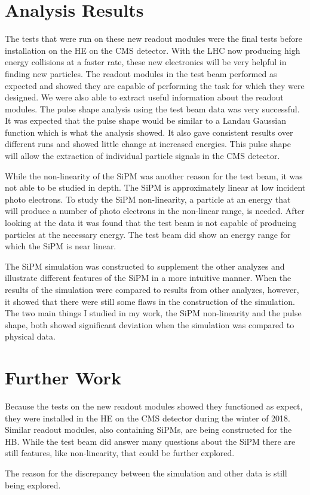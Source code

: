 \section{Analysis Results}

The tests that were run on these new readout modules were the final tests before installation on the HE on the CMS detector. With the LHC now producing high energy collisions at a faster rate, these new electronics will be very helpful in finding new particles. The readout modules in the test beam performed as expected and showed they are capable of performing the task for which they were designed. We were also able to extract useful information about the readout modules. The pulse shape analysis using the test beam data was very successful. It was expected that the pulse shape would be similar to a Landau Gaussian function which is what the analysis showed. It also gave consistent results over different runs and showed little change at increased energies. This pulse shape will allow the extraction of individual particle signals in the CMS detector. 

While the non-linearity of the SiPM was another reason for the test beam, it was not able to be studied in depth. The SiPM is approximately linear at low incident photo electrons. To study the SiPM non-linearity, a particle at an energy that will produce a number of photo electrons in the non-linear range, is needed. After looking at the data it was found that the test beam is not capable of producing particles at the necessary energy. The test beam did show an energy range for which the SiPM is near linear.

The SiPM simulation was constructed to supplement the other analyzes and illustrate different features of the SiPM in a more intuitive manner. When the results of the simulation were compared to results from other analyzes, however, it showed that there were still some flaws in the construction of the simulation. The two main things I studied in my work, the SiPM non-linearity and the pulse shape, both showed significant deviation when the simulation was compared to physical data. 

\section{Further Work}

Because the tests on the new readout modules showed they functioned as expect, they were installed in the HE on the CMS detector during the winter of 2018. Similar readout modules, also containing SiPMs, are being constructed for the HB. While the test beam did answer many questions about the SiPM there are still features, like non-linearity, that could be further explored.

The reason for the discrepancy between the simulation and other data is still being explored. 